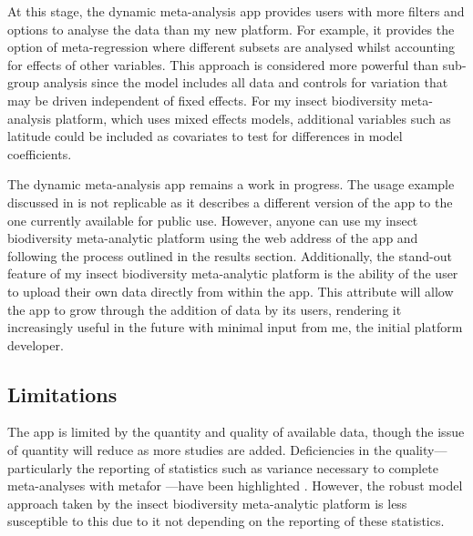 \documentclass[11pt]{article}
\begin{document}
			\noindent At this stage, the dynamic meta-analysis app \parencite{shackelford2021dynamic} provides users with more filters and options to analyse the data than my new platform. For example, it provides the option of meta-regression where different subsets are analysed whilst accounting for effects of other variables. This approach is considered more powerful than sub-group analysis since the model includes all data and controls for variation that may be driven independent of fixed effects. For my insect biodiversity meta-analysis platform, which uses mixed effects models, additional variables such as latitude could be included as covariates to test for differences in model coefficients. 
			
			\noindent The dynamic meta-analysis app remains a work in progress. The usage example discussed in \textcite{shackelford2021dynamic} is not replicable as it describes a different version of the app to the one currently available for public use. However, anyone can use my insect biodiversity meta-analytic platform using the web address of the app and following the process outlined in the results section. Additionally, the stand-out feature of my insect biodiversity meta-analytic platform is the ability of the user to upload their own data directly from within the app. This attribute will allow the app to grow through the addition of data by its users, rendering it increasingly useful in the future with minimal input from me, the initial platform developer. 
			
		\subsection{Limitations}
			The app is limited by the quantity and quality of available data, though the issue of quantity will reduce as more studies are added. Deficiencies in the quality—particularly the reporting of statistics such as variance necessary to complete meta-analyses with metafor \parencite{viechtbauer2010conducting}—have been highlighted \parencite{hedges1999meta,stewart2010meta,gurevitch2018meta}. However, the robust model approach taken by the insect biodiversity meta-analytic platform is less susceptible to this due to it not depending on the reporting of these statistics. 
			
\end{document}
